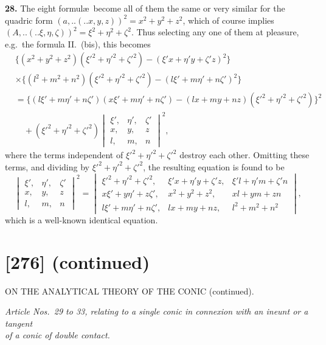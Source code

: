 \documentclass[12pt,a4paper]{article}
\newcommand{\qform}[2]{(#1 \mathbin{..} #2)}
\theoremstyle{definition}
\begin{document}
\textbf{28.} The eight formul\ae\ become all of them the same or very similar for the quadric form $(a,..\!\qform{}{x, y, z})^{2} = x^{2} + y^{2} + z^{2}$, which of course implies $(A,..\!\qform{}{\xi, \eta, \zeta})^{2} = \xi^{2} + \eta^{2} + \zeta^{2}$. Thus selecting any one of them at pleasure, e.g.\ the formula II.\ (bis), this becomes
\begin{align*}
&\{(x^{2} + y^{2} + z^{2})(\xi'^{2} + \eta'^{2} + \zeta'^{2}) - (\xi'x + \eta'y + \zeta'z)^{2}\}\\
&\times \{(l^{2} + m^{2} + n^{2})(\xi'^{2} + \eta'^{2} + \zeta'^{2}) - (l\xi' + m\eta' + n\zeta')^{2}\}\\
&= \{(l\xi' + m\eta' + n\zeta')(x\xi' + m\eta' + n\zeta') - (lx + my + nz)(\xi'^{2} + \eta'^{2} + \zeta'^{2})\}^{2}\\
&\quad + (\xi'^{2} + \eta'^{2} + \zeta'^{2})
\begin{vmatrix}
\xi', & \eta', & \zeta' \\
x, & y, & z \\
l, & m, & n
\end{vmatrix}^{2},
\end{align*}
where the terms independent of $\xi'^{2} + \eta'^{2} + \zeta'^{2}$ destroy each other. Omitting these terms, and dividing by $\xi'^{2} + \eta'^{2} + \zeta'^{2}$, the resulting equation is found to be
\[
\begin{vmatrix}
\xi', & \eta', & \zeta' \\
x, & y, & z \\
l, & m, & n
\end{vmatrix}^{2}
=
\begin{vmatrix}
\xi'^{2} + \eta'^{2} + \zeta'^{2}, & \xi'x + \eta'y + \zeta'z, & \xi'l + \eta'm + \zeta'n \\
x\xi' + y\eta' + z\zeta', & x^{2} + y^{2} + z^{2}, & xl + ym + zn \\
l\xi' + m\eta' + n\zeta', & lx + my + nz, & l^{2} + m^{2} + n^{2}
\end{vmatrix},
\]
which is a well-known identical equation.

\newpage
\section*{[276] (continued)}
\begin{center}
{\large ON THE ANALYTICAL THEORY OF THE CONIC (continued).}
\end{center}

\medskip
\begin{center}
\textit{Article Nos.\ 29 to 33, relating to a single conic in connexion with an ineunt or a tangent\\of a conic of double contact.}
\end{center}
\medskip
\end{document}
